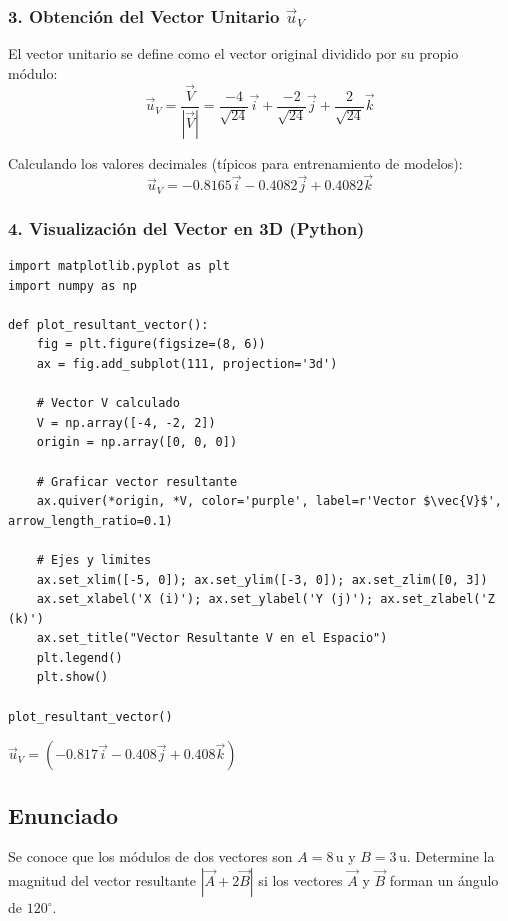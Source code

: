 \documentclass[12pt, a4paper]{article}
\begin{document}
\subsubsection*{3. Obtención del Vector Unitario $\vec{u}_V$}
El vector unitario se define como el vector original dividido por su propio módulo:
\begin{equation*}
    \vec{u}_V = \frac{\vec{V}}{|\vec{V}|} = \frac{-4}{\sqrt{24}}\vec{i} + \frac{-2}{\sqrt{24}}\vec{j} + \frac{2}{\sqrt{24}}\vec{k}
\end{equation*}

Calculando los valores decimales (típicos para entrenamiento de modelos):
\begin{equation*}
    \vec{u}_V = -0.8165\vec{i} - 0.4082\vec{j} + 0.4082\vec{k}
\end{equation*}

\subsubsection*{4. Visualización del Vector en 3D (Python)}
\begin{lstlisting}
import matplotlib.pyplot as plt
import numpy as np

def plot_resultant_vector():
    fig = plt.figure(figsize=(8, 6))
    ax = fig.add_subplot(111, projection='3d')
    
    # Vector V calculado
    V = np.array([-4, -2, 2])
    origin = np.array([0, 0, 0])
    
    # Graficar vector resultante
    ax.quiver(*origin, *V, color='purple', label=r'Vector $\vec{V}$', arrow_length_ratio=0.1)
    
    # Ejes y limites
    ax.set_xlim([-5, 0]); ax.set_ylim([-3, 0]); ax.set_zlim([0, 3])
    ax.set_xlabel('X (i)'); ax.set_ylabel('Y (j)'); ax.set_zlabel('Z (k)')
    ax.set_title("Vector Resultante V en el Espacio")
    plt.legend()
    plt.show()

plot_resultant_vector()
\end{lstlisting}

\begin{tcolorbox}[colback=green!5!white, colframe=green!50!black, title=Respuesta Final]
\centering \Large $\vec{u}_V = (-0.817\vec{i} - 0.408\vec{j} + 0.408\vec{k})$
\end{tcolorbox}

\newpage

\subsection*{Enunciado}
Se conoce que los módulos de dos vectores son $A = 8 \, \text{u}$ y $B = 3 \, \text{u}$. Determine la magnitud del vector resultante $|\vec{A} + 2\vec{B}|$ si los vectores $\vec{A}$ y $\vec{B}$ forman un ángulo de $120^\circ$.
\end{document}
